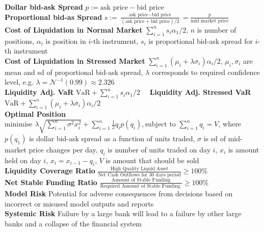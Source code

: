 \documentclass[12pt,landscape, a4paper]{article}
\theoremstyle{remark}
\newcommand{\VaR}{\mathrm{VaR}}
\newcommand{\N}{\mathcal{N}}
\begin{document}
\begin{multicols*}{3}
\textbf{Dollar bid-ask Spread} $p:= \text{ask price} - \text{bid price}$\\
\textbf{Proportional bid-as Spread} $s:= \frac{\text{ask price} - \text{bid price}}{(\text{ask price} + \text{bid price}) / 2 } = \frac{p}{\text{mid market price}}$\\

\textbf{Cost of Liquidation in Normal Market} $\sum^n_{i=1} s_i \alpha_1 / 2 $, $n$ is number of positions, $\alpha_i$ is position in $i$-th instrument, $s_i$ is proportional bid-ask spread for $i$-th instrument\\

\textbf{Cost of Liquidation in Stressed Market} $\sum^n_{i=1}(\mu_i + \lambda \sigma_i) \alpha_i / 2$, $\mu_i, \sigma_i$ are mean and sd of proportional bid-ask spread, $\lambda$ corresponds to required confidence level, e.g. $\lambda = \N^{-1} (0.99) \approx 2.326$\\

\textbf{Liquidity Adj. VaR} $\VaR + \sum^n_{i=1} s_i \alpha_1 / 2 \quad$ \textbf{Liquidity Adj. Stressed VaR} $\VaR + \sum^n_{i=1}(\mu_i + \lambda \sigma_i) \alpha_i / 2$\\

\textbf{Optimal Position} $\text{minimise } \lambda \sqrt{\sum^n_{i=1} \sigma^2 x^2_i} + \sum^n_{i=1} \frac{1}{2} q_i p (q_i), \text{subject to } \sum^n_{i=1} q_i = V $, where $p(q_1)$ is dollar bid-ask spread as a function of units traded, $\sigma$ is sd of mid-market price changes per day, $q_i$ is number of units traded on day $i$,  $x_i$ is amount held on day $i$, $x_i = x_{i-1} - q_i$, $V$ is amount that should be sold\\

\textbf{Liquidity Coverage Ratio} $\frac{\text{High Quality Liquid Asset}}{\text{Net Cash Outflows for 30 days period}} \geq 100\%$\\

\textbf{Net Stable Funding Ratio} $\frac{\text{Amount of Stable Funding}}{ \text{Required Amount of Stable Funding }} \geq 100\%$\\

\textbf{Model Risk} Potential for adverse consequences from decisions based on incorrect or misused model outputs and reports\\

\textbf{Systemic Risk} Failure by a large bank will lead to a failure by other large banks and a collapse of the financial system\\


\end{multicols*}
\end{document}
